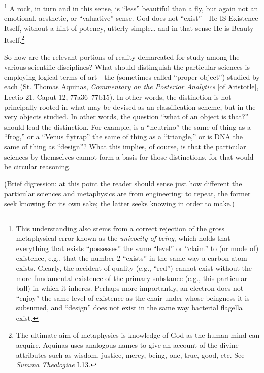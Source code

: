 \footnote{This understanding also stems from a correct rejection of the gross metaphysical error known as the \textit{univocity of being}, which holds that everything that exists ``possesses'' the same ``level'' or ``claim'' to (or mode of) existence, e.g., that the number 2 ``exists'' in the same way a carbon atom exists. Clearly, the accident of quality (e.g., ``red'') cannot exist without the more fundamental existence of the primary substance (e.g., this particular ball) in which it inheres. Perhaps more importantly, an electron does not ``enjoy'' the same level of existence as the chair under whose beingness it is subsumed, and ``design'' does not exist in the same way bacterial flagella exist.} A rock, in turn and in this sense, is ``less'' beautiful than a fly, but again not an emotional, aesthetic, or ``valuative'' sense. God does not ``exist''---He IS Existence Itself, without a hint of potency, utterly simple\ldots{} and in that sense He is Beauty Itself.\footnote{The ultimate aim of metaphysics is knowledge of God as the human mind can acquire. Aquinas uses analogous names to give an account of the divine attributes such as wisdom, justice, mercy, being, one, true, good, etc. See \textit{Summa Theologiae} I.13.}

So how are the relevant portions of reality demarcated for study among the various scientific disciplines? What should distinguish the particular sciences is---employing logical terms of art---the  (sometimes called ``proper object'') studied by each (St. Thomas Aquinas, \textit{Commentary on the Posterior Analytics} [of Aristotle], Lectio 21, Caput 12, 77a36--77b15). In other words, the distinction is not principally rooted in what may be devised as an  classification scheme, but in the very objects studied. In other words, the question ``what  of an object is that?'' should lead the distinction. For example, is a ``neutrino'' the same  of thing as a ``frog,'' or a ``Venus flytrap'' the same  of thing as a ``triangle,'' or is DNA the same  of thing as ``design''? What this implies, of course, is that the particular sciences by themselves cannot form a basis for those distinctions, for that would be circular reasoning.

(Brief digression: at this point the reader should sense just how different the particular sciences and metaphysics are from engineering: to repeat, the former seek knowing for its own sake; the latter seeks knowing in order to make.)

